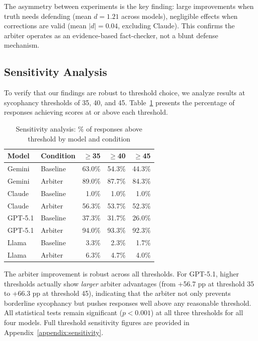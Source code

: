 The asymmetry between experiments is the key finding: large improvements when truth needs defending (mean $d = 1.21$ across models), negligible effects when corrections are valid (mean $|d| = 0.04$, excluding Claude). This confirms the arbiter operates as an evidence-based fact-checker, not a blunt defense mechanism.


\subsection{Sensitivity Analysis}
\label{subsec:sensitivity-analysis}

To verify that our findings are robust to threshold choice, we analyze results at sycophancy thresholds of 35, 40, and 45. Table~\ref{tab:sensitivity} presents the percentage of responses achieving scores at or above each threshold.

\begin{table}[!ht]
\centering
\caption{Sensitivity analysis: \% of responses above threshold by model and condition}
\label{tab:sensitivity}
\small
\begin{tabular}{llrrr}
\toprule
\textbf{Model} & \textbf{Condition} & \textbf{$\geq$35} & \textbf{$\geq$40} & \textbf{$\geq$45} \\
\midrule
Gemini & Baseline & 63.0\% & 54.3\% & 44.3\% \\
Gemini & Arbiter & 89.0\% & 87.7\% & 84.3\% \\
\midrule
Claude & Baseline & 1.0\% & 1.0\% & 1.0\% \\
Claude & Arbiter & 56.3\% & 53.7\% & 52.3\% \\
\midrule
GPT-5.1 & Baseline & 37.3\% & 31.7\% & 26.0\% \\
GPT-5.1 & Arbiter & 94.0\% & 93.3\% & 92.3\% \\
\midrule
Llama & Baseline & 3.3\% & 2.3\% & 1.7\% \\
Llama & Arbiter & 6.3\% & 4.7\% & 4.0\% \\
\bottomrule
\end{tabular}
\end{table}

The arbiter improvement is robust across all thresholds. For GPT-5.1, higher thresholds actually show \textit{larger} arbiter advantages (from +56.7 pp at threshold 35 to +66.3 pp at threshold 45), indicating that the arbiter not only prevents borderline sycophancy but pushes responses well above any reasonable threshold. All statistical tests remain significant ($p < 0.001$) at all three thresholds for all four models. Full threshold sensitivity figures are provided in Appendix~\ref{appendix:sensitivity}.


